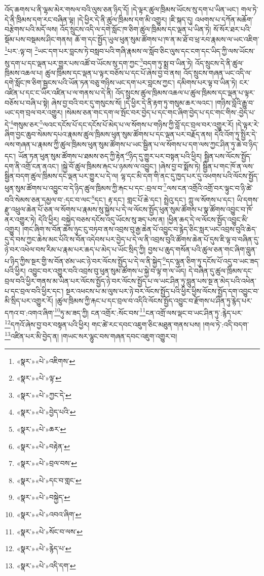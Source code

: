 འོད་ཆགས་པ་ནི་ལྷམ་མེར་གསལ་བའི་ལུས་ཅན་ཉིད་དོ། །དེ་ལྟར་ཚུལ་ཁྲིམས་ཡོངས་སུ་དག་པ་ཡིན་ཡང་། གལ་ཏེ་དེ་ནི་ཁྲིམས་དག་རང་བཞིན་ལྟ། །དེ་ཕྱིར་དེ་ནི་ཚུལ་ཁྲིམས་དག་མི་འགྱུར། །ཇི་སྐད་དུ། འཕགས་པ་དཀོན་མཆོག་བརྩེགས་པའི་མདོ་ལས། འོད་སྲུངས་འདི་ལ་དགེ་སློང་ཁ་ཅིག་ཚུལ་ཁྲིམས་དང་ལྡན་པ་ཡིན་ཏེ། སོ་སོར་ཐར་པའི་སྡོམ་པས་བསྡམས་ཤིང་གནས། ཆོ་ག་དང་སྤྱོད་ཡུལ་ཕུན་སུམ་ཚོགས་པ་ཁ་ན་མ་ཐོ་བ་ཕྲ་རབ་རྣམས་ལ་ཡང་འཇིག་\footnote{«སྣར་»«པེ་»འཇིགས་}པར་:ལྟ་བ། \footnote{«སྣར་»«པེ་»ལྟ་}ཡང་དག་པར་བླངས་ཏེ་བསླབ་པའི་གཞི་རྣམས་ལ་སློབ་ཅིང་ལུས་དང་ངག་དང་ཡིད་ཀྱི་ལས་ཡོངས་སུ་དག་པ་དང་ལྡན་པར་གྱུར་པས་འཚོ་བ་ཡོངས་སུ་དག་ཀྱང་\footnote{«སྣར་»«པེ་»ཀྱང་དེ་}བདག་ཏུ་སྨྲ་བ་ཡིན་ཏེ། འོད་སྲུངས་དེ་ནི་ཚུལ་ཁྲིམས་འཆལ་པ། ཚུལ་ཁྲིམས་དང་ལྡན་པ་ལྟར་བཅོས་པ་དང་པོ་ཞེས་བྱ་བ་ནས། འོད་སྲུངས་གཞན་ཡང་འདི་ལ་དགེ་སློང་ཁ་ཅིག་སྦྱངས་པའི་ཡོན་ཏན་བཅུ་གཉིས་ཡང་དག་པར་བླངས་ཀྱང་། དམིགས་པར་ལྟ་བ་ཡིན་ཏེ། ངར་འཛིན་པ་དང་ང་ཡིར་འཛིན་པ་ལ་གནས་པ་དེ་ནི། འོད་སྲུངས་ཚུལ་ཁྲིམས་འཆལ་པ་ཚུལ་ཁྲིམས་དང་ལྡན་པ་ལྟར་བཅོས་པ་བཞི་པ་སྟེ། ཞེས་བྱ་བའི་བར་དུ་གསུངས་སོ། །དེ་ཕྱིར་དེ་ནི་རྟག་ཏུ་གསུམ་ཆར་ལའང་། །གཉིས་བློའི་རྒྱུ་བ་ཡང་དག་བྲལ་བར་འགྱུར། །སེམས་ཅན་གང་དག་ལ་སྤོང་བར་བྱེད་པ་དང་གང་ཞིག་བྱེད་པ་དང་གང་གིས་:བྱེད་པ་དེ་\footnote{«སྣར་»«པེ་»བྱེད་པའི་}གསུམ་ཅར་\footnote{«སྣར་»«པེ་»ཆར་}ལའང་དངོས་པོ་དང་དངོས་པོ་མེད་པ་ལ་སོགས་པ་གཉིས་ཀྱི་བློ་དང་བྲལ་བར་འགྱུར་རོ། །དེ་ལྟར་རེ་ཞིག་བྱང་ཆུབ་སེམས་དཔའ་རྣམས་ཚུལ་ཁྲིམས་ཕུན་སུམ་ཚོགས་པ་དང་ལྡན་པར་བརྗོད་ནས། དེའི་འོག་ཏུ་སྤྱིར་དེ་ལས་གཞན་པ་རྣམས་ཀྱི་ཚུལ་ཁྲིམས་ཕུན་སུམ་ཚོགས་པ་ཡང་སྦྱིན་པ་ལ་སོགས་པ་དག་ལས་ཀྱང་ཤིན་ཏུ་ཆེ་བ་ཉིད་དང་། ཡོན་ཏན་ཕུན་སུམ་ཚོགས་པ་ཐམས་ཅད་ཀྱི་རྟེན་\footnote{«སྣར་»«པེ་»བརྟེན་}ཉིད་དུ་གྱུར་པར་བསྟན་པའི་ཕྱིར། སྦྱིན་པས་ལོངས་སྤྱོད་དག་ནི་འགྲོ་ངན་ནའང་། །སྐྱེ་བོ་ཚུལ་ཁྲིམས་རྐང་པ་ཉམས་ལ་འབྱུང་། །ཞེས་བྱ་བ་སྨོས་ཏེ། སྦྱིན་པ་གང་ཁོ་ན་ལས་སྦྱིན་བདག་ཚུལ་ཁྲིམས་དང་ལྡན་པར་གྱུར་པ་དེ་ལ། ལྷ་དང་མི་དག་གི་ནང་དུ་ཁྱད་པར་དུ་འཕགས་པའི་ལོངས་སྤྱོད་ཕུན་སུམ་ཚོགས་པ་འབྱུང་བ་དེ་ཉིད་ཚུལ་ཁྲིམས་ཀྱི་རྐང་པ་དང་:བྲལ་བ་\footnote{«སྣར་»«པེ་»བྲལ་བས་}ལས་ངན་འགྲོའི་འགྲོ་བར་ལྟུང་བ་ཉི་ཚེ་བའི་སེམས་ཅན་དམྱལ་བ་:དང་བ་ལང་\footnote{«སྣར་»«པེ་»དང་བ་གླང་}དང་། རྟ་དང་། གླང་པོ་ཆེ་དང་། སྤྲེའུ་དང་། ཀླུ་ལ་སོགས་པ་དང་། ཡི་དགས་རྫུ་འཕྲུལ་ཆེན་པོ་ཅན་ལ་སོགས་པ་རྣམས་སུ་སྐྱེས་པ་དེ་ལ་ལོངས་སྤྱོད་ཕུན་སུམ་ཚོགས་པ་སྣ་ཚོགས་འབྱུང་བ་ཁོ་ནར་འགྱུར་ཏེ། དེའི་ཕྱིར། བསྐྱེད་བཅས་དངོས་འདུ་ཡོངས་སུ་ཟད་པས་ན། །ཕྱིན་ཆད་དེ་ལ་ལོངས་སྤྱོད་འབྱུང་མི་འགྱུར། །གང་ཞིག་ས་བོན་ཆེས་ཉུང་ངུ་བཏབ་ནས་འབྲས་བུ་རྒྱ་ཆེན་པོ་འབྱུང་བ་རྙེད་ཅིང་སླར་ཡང་འབྲས་བུའི་ཆེད་དུ་དེ་བས་ཀྱང་ཆེས་མང་པོའི་ས་བོན་འདེབས་པར་བྱེད་པ་དེ་ལ་ནི་འབྲས་བུའི་ཚོགས་ཆེན་པོ་དུས་ཇི་ལྟ་བ་བཞིན་དུ་ཉེ་བར་འཕེལ་བས་རིམ་པ་རྣམ་པར་ཆད་པ་མེད་པ་ཡོང་སྲིད་ཀྱི། བྱས་པ་ཆུད་གསོན་པའི་ཚུལ་ཅན་གང་ཞིག་བླུན་པ་ཉིད་ཀྱིས་སྔར་གྱི་ས་བོན་ཙམ་ཡང་ཉེ་བར་ལོངས་སྤྱོད་པ་དེ་ལ་ནི་སྐྱེད་\footnote{«སྣར་»«པེ་»བསྐྱེད་}དང་ལྷན་ཅིག་ཏུ་དངོས་པོ་འདུ་བ་ཡང་ཟད་པའི་ཕྱིར། འབྱུང་བར་འགྱུར་བའི་འབྲས་བུ་ཕུན་སུམ་ཚོགས་པ་སྐྱེ་བ་ལྟ་ག་ལ་ཡོད། དེ་བཞིན་དུ་ཚུལ་ཁྲིམས་དང་བྲལ་བའི་ཕྱིར་གནས་མ་ཡིན་པར་ལོངས་སྤྱོད་ཉེ་བར་ལོངས་སྤྱོད་པ་ལ་ཡང་ཤིན་ཏུ་བླུན་པས་སྔ་ན་མེད་པའི་འཕེན་པ་དང་བྲལ་བའི་ཕྱིར་དང་། སྔར་འཕངས་པ་མ་ལུས་པར་ཉེ་བར་ལོངས་སྤྱོད་པའི་ཕྱིར་ཕྱིས་ལོངས་སྤྱོད་དག་འབྱུང་བ་མི་སྲིད་པར་འགྱུར་རོ། །ཚུལ་ཁྲིམས་ཀྱི་རྐང་པ་དང་བྲལ་བ་འདིའི་ལོངས་སྤྱོད་འབྱུང་བ་རྫོགས་པ་ཤིན་ཏུ་རྙེད་པར་དཀའ་བ་:འགའ་ཞིག་\footnote{«སྣར་»«པེ་»འབའ་ཞིག་}ཏུ་མ་ཟད་ཀྱི། ངན་འགྲོར་:སོང་བས་\footnote{«སྣར་»«པེ་»སོང་བ་ལས་}ངན་འགྲོ་ལས་ལྡང་བ་ཡང་ཤིན་ཏུ་:རྙེད་པར་\footnote{«སྣར་»«པེ་»རྙེད་པ་}དཀའོ་ཞེས་བྱ་བར་བསྟན་པའི་ཕྱིར། གང་ཚེ་རང་དབང་འཇུག་ཅིང་མཐུན་གནས་པས། །གལ་ཏེ་:འདི་བདག་\footnote{«སྣར་»«པེ་»འདི་དག་}འཛིན་པར་མི་བྱེད་ན། །གཡང་སར་ལྷུང་བས་གཞན་དབང་འཇུག་འགྱུར་བ། 